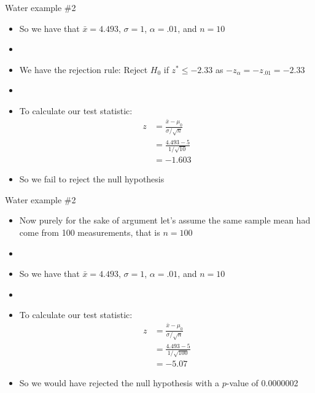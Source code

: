 \documentclass[xcolor=dvipsnames]{beamer}
\begin{document}
\begin{frame}{Water example \#2}
	\begin{itemize}
		\item So we have that $\bar{x} = 4.493$, $\sigma = 1$, $\alpha = .01$, and $n = 10$ \pause
		\item[]
		\item We have the rejection rule: Reject $H_0$ if $z^* \leq -2.33$ as  $-z_{\alpha} = -z_{.01}= -2.33$ \pause
		\item[]
		\item To calculate our test statistic:
		\begin{align*}
			z &= \frac{\bar{x}-\mu_0}{\sigma / \sqrt{n}} \\
			&=\frac{4.493-5}{1 / \sqrt{10}} \\
			&= -1.603
		\end{align*} \pause
		\item So we fail to reject the null hypothesis
	\end{itemize}
\end{frame}

\begin{frame}{Water example \#2}
	\begin{itemize}
		\item Now purely for the sake of argument let's assume the same sample mean had come from 100 measurements, that is $n = 100$ \pause
		\item[]
		\item So we have that $\bar{x} = 4.493$, $\sigma = 1$, $\alpha = .01$, and $n = 10$ \pause
		\item[]
		\item To calculate our test statistic: \pause
		\begin{align*}
		z &= \frac{\bar{x}-\mu_0}{\sigma / \sqrt{n}} \\
		&=\frac{4.493-5}{1 / \sqrt{100}} \\
		&= -5.07
		\end{align*} \pause
		\item So we would have rejected the null hypothesis with a $p$-value of 0.0000002
	\end{itemize}
\end{frame}
\end{document}

